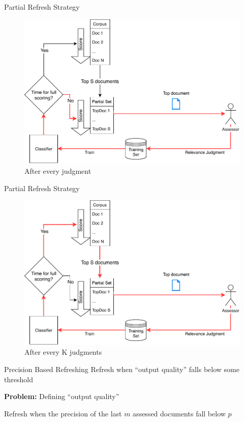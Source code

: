 \documentclass[14pt]{beamer}
\begin{document}
\begin{frame}{Partial Refresh Strategy}
\begin{figure}
 \centering 
 \includegraphics[width=1.0\textwidth]{animation/partial1.pdf}
 \caption{After every judgment}
\end{figure}
\end{frame}

\begin{frame}{Partial Refresh Strategy}
\begin{figure}
 \centering 
 \includegraphics[width=1.0\textwidth]{animation/partial2.pdf}
 \caption{After every K judgments}
\end{figure}
\end{frame}

\begin{frame}{Precision Based Refreshing}
Refresh when ``output quality'' falls below some threshold

\pause
\vskip 1cm
\textbf{Problem:} Defining ``output quality''

\pause
\vskip 1cm
Refresh when the precision of the last $m$ assessed documents fall below $p$
\end{frame}
\end{document}
